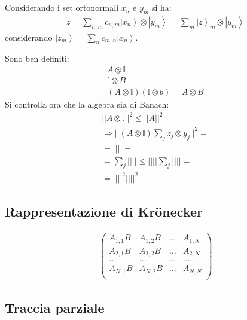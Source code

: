 Considerando i set ortonormali $x_n$ e $y_m$ si ha:
\begin{equation}\begin{split}
z=\sum_{n,m}{c_{n,m}\left |x_n \right\rangle\otimes \left |y_m \right\rangle}=\sum_m{\left |z \right\rangle_m\otimes \left |y_m \right\rangle}
\end{split}\end{equation}
considerando $\left |z_m \right\rangle=\sum_n{c_{m,n}\left |x_n \right\rangle}$.

Sono ben definiti:
\begin{equation}\begin{split}
A\otimes\mathbb{I}\\
\mathbb{I}\otimes B\\
\left(A\otimes\mathbb{I}\right)\left(\mathbb{I}\otimes b\right)=A\otimes B
\end{split}\end{equation}
Si controlla ora che la algebra sia di Banach:
\begin{equation}\begin{split}
||A\otimes \mathbb{I}||^2\le ||A||^2\\
\Longrightarrow ||\left(A\otimes \mathbb{I}\right)\sum_j{z_j\otimes y_j}||^2=\\
=||||=\\
=\sum_j{||||}\le ||||\sum_j{||||}=\\
=||||^2||||^2
\end{split}\end{equation}


\subsection{Rappresentazione di Krönecker} %
\begin{equation}\begin{split}
\left(\begin{matrix}
A_{1,1}B & A_{1,2}B & \dots & A_{1,N}\\
A_{2,1}B & A_{2,2}B & \dots & A_{2,N}\\
\dots & \dots & \dots & \dots\\
A_{N,1}B & A_{N,2}B & \dots & A_{N,N}\\
\end{matrix}\right)
\end{split}\end{equation}

\subsection{Traccia parziale} %

